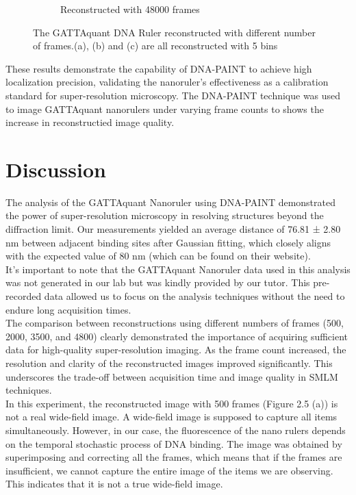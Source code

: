 \documentclass[a4paper,english,12pt,bibliography=totoc]{scrreprt}
\begin{document}
\begin{figure}[H]
\begin{subfigure}[b]{0.49\textwidth}
        \caption{Reconstructed with 48000 frames}
        \label{fig:image4}
    \end{subfigure}
    \caption{The  GATTAquant DNA Ruler reconstructed with different number of frames.(a), (b) and (c) are all reconstructed with 5 bins}
    \label{fig:subfigurespaint}
\end{figure}

These results demonstrate the capability of DNA-PAINT to achieve high localization precision, validating the nanoruler's effectiveness as a calibration standard for super-resolution microscopy. The DNA-PAINT technique was used to image GATTAquant nanorulers under varying frame counts to shows the increase in reconstructied image quality. 

\section{Discussion}
The analysis of the GATTAquant Nanoruler using DNA-PAINT demonstrated the power of super-resolution microscopy in resolving structures beyond the diffraction limit. Our measurements yielded an average distance of 76.81 ± 2.80 nm between adjacent binding sites after Gaussian fitting, which closely aligns with the expected value of 80 nm (which can be found on their website).\\

It's important to note that the GATTAquant Nanoruler data used in this analysis was not generated in our lab but was kindly provided by our tutor. This pre-recorded data allowed us to focus on the analysis techniques without the need to endure long acquisition times.\\

The comparison between reconstructions using different numbers of frames (500, 2000, 3500, and 4800) clearly demonstrated the importance of acquiring sufficient data for high-quality super-resolution imaging. As the frame count increased, the resolution and clarity of the reconstructed images improved significantly. This underscores the trade-off between acquisition time and image quality in SMLM techniques.\\

In this experiment, the reconstructed image with 500 frames (Figure 2.5 (a)) is not a real wide-field image. A wide-field image is supposed to capture all items simultaneously. However, in our case, the fluorescence of the nano rulers depends on the temporal stochastic process of DNA binding. The image was obtained by superimposing and correcting all the frames, which means that if the frames are insufficient, we cannot capture the entire image of the items we are observing. This indicates that it is not a true wide-field image.
\end{document}
